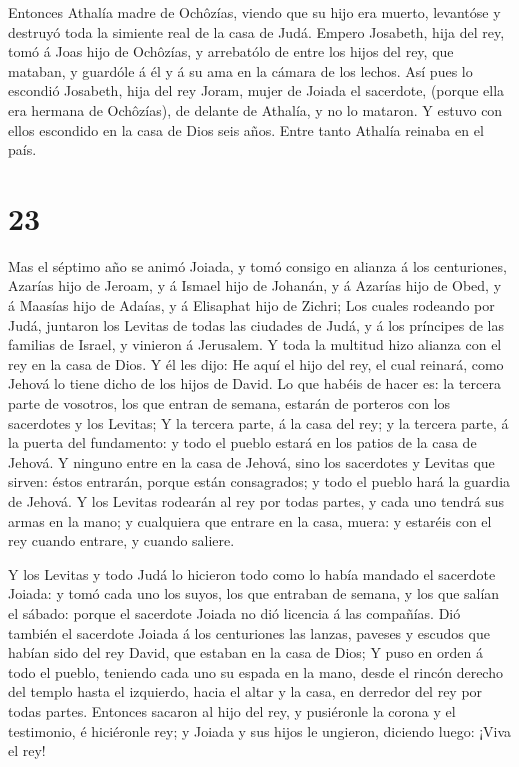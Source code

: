  Entonces Athalía madre de Ochôzías, viendo que su hijo era
muerto, levantóse y destruyó toda la simiente real de la casa de Judá.
 Empero Josabeth, hija del rey, tomó á Joas hijo de
Ochôzías, y arrebatólo de entre los hijos del rey, que mataban, y
guardóle á él y á su ama en la cámara de los lechos. Así pues lo
escondió Josabeth, hija del rey Joram, mujer de Joiada el sacerdote,
(porque ella era hermana de Ochôzías), de delante de Athalía, y no lo
mataron.  Y estuvo con ellos escondido en la casa de Dios
seis años. Entre tanto Athalía reinaba en el país.

\hypertarget{section-22}{%
\section{23}\label{section-22}}

 Mas el séptimo año se animó Joiada, y tomó consigo en
alianza á los centuriones, Azarías hijo de Jeroam, y á Ismael hijo de
Johanán, y á Azarías hijo de Obed, y á Maasías hijo de Adaías, y á
Elisaphat hijo de Zichri;  Los cuales rodeando por Judá,
juntaron los Levitas de todas las ciudades de Judá, y á los príncipes de
las familias de Israel, y vinieron á Jerusalem.  Y toda la
multitud hizo alianza con el rey en la casa de Dios. Y él les dijo: He
aquí el hijo del rey, el cual reinará, como Jehová lo tiene dicho de los
hijos de David.  Lo que habéis de hacer es: la tercera parte
de vosotros, los que entran de semana, estarán de porteros con los
sacerdotes y los Levitas;  Y la tercera parte, á la casa del
rey; y la tercera parte, á la puerta del fundamento: y todo el pueblo
estará en los patios de la casa de Jehová.  Y ninguno entre
en la casa de Jehová, sino los sacerdotes y Levitas que sirven: éstos
entrarán, porque están consagrados; y todo el pueblo hará la guardia de
Jehová.  Y los Levitas rodearán al rey por todas partes, y
cada uno tendrá sus armas en la mano; y cualquiera que entrare en la
casa, muera: y estaréis con el rey cuando entrare, y cuando saliere.

 Y los Levitas y todo Judá lo hicieron todo como lo había
mandado el sacerdote Joiada: y tomó cada uno los suyos, los que entraban
de semana, y los que salían el sábado: porque el sacerdote Joiada no dió
licencia á las compañías.  Dió también el sacerdote Joiada á
los centuriones las lanzas, paveses y escudos que habían sido del rey
David, que estaban en la casa de Dios;  Y puso en orden á
todo el pueblo, teniendo cada uno su espada en la mano, desde el rincón
derecho del templo hasta el izquierdo, hacia el altar y la casa, en
derredor del rey por todas partes.  Entonces sacaron al
hijo del rey, y pusiéronle la corona y el testimonio, é hiciéronle rey;
y Joiada y sus hijos le ungieron, diciendo luego: ¡Viva el rey!

